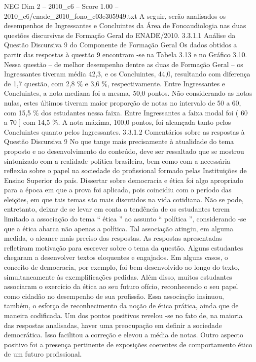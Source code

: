 \begin{textsample}{NEG Dim 2 – 2010\_c6 – Score 1.00 – 2010\_c6/enade\_2010\_fono\_c03e305949.txt}
A seguir, serão analisados os desempenhos de Ingressantes e Concluintes da Área de Fonoaudiologia nas duas questões discursivas de Formação Geral do ENADE/2010. 3.3.1.1 Análise da Questão Discursiva 9 do Componente de Formação Geral Os dados obtidos a partir das respostas à questão 9 encontram -se na Tabela 3.13 e no Gráfico 3.10.
Nessa questão – de melhor desempenho dentre as duas de Formação Geral – os Ingressantes tiveram média 42,3, e os Concluintes, 44,0, resultando com diferença de 1,7 questão, com 2,8 \% e 3,6 \%, respectivamente.
Entre Ingressantes e Concluintes, a nota mediana foi a mesma, 50,0 pontos.
Não considerando as notas nulas, estes últimos tiveram maior proporção de notas no intervalo de 50 a 60, com 15,5 \% dos estudantes nessa faixa.
Entre Ingressantes a faixa modal foi ( 60 a 70 ] com 14,5 \%.
A nota máxima, 100,0 pontos, foi alcançada tanto pelos Concluintes quanto pelos Ingressantes. 3.3.1.2 Comentários sobre as respostas à Questão Discursiva 9 No que tange mais precisamente à atualidade do tema proposto e ao desenvolvimento do conteúdo, deve ser ressaltado que se mostrou sintonizado com a realidade política brasileira, bem como com a necessária reflexão sobre o papel na sociedade do profissional formado pelas Instituições de Ensino Superior do país.
Dissertar sobre democracia e ética foi algo apropriado para a época em que a prova foi aplicada, pois coincidiu com o período das eleições, em que tais temas são mais discutidos na vida cotidiana.
Não se pode, entretanto, deixar de se levar em conta a tendência de os estudantes terem limitado a associação do tema “ ética ” ao assunto “ política ”, considerando -se que a ética abarca não apenas a política.
Tal associação atingiu, em alguma medida, o alcance mais preciso das respostas.
As respostas apresentadas refletiram motivação para escrever sobre o tema da questão.
Alguns estudantes chegaram a desenvolver textos eloquentes e engajados.
Em alguns casos, o conceito de democracia, por exemplo, foi bem desenvolvido ao longo do texto, simultaneamente às exemplificações pedidas.
Além disso, muitos estudantes associaram o exercício da ética ao seu futuro ofício, reconhecendo o seu papel como cidadão no desempenho de sua profissão.
Essa associação insinuou, também, o esforço de reconhecimento da noção de ética prática, ainda que de maneira codificada.
Um dos pontos positivos revelou -se no fato de, na maioria das respostas analisadas, haver uma preocupação em definir a sociedade democrática.
Isso facilitou a correção e elevou a média de notas.
Outro aspecto positivo foi a presença pertinente de exposições coerentes de comportamento ético de um futuro profissional.

\end{textsample}
